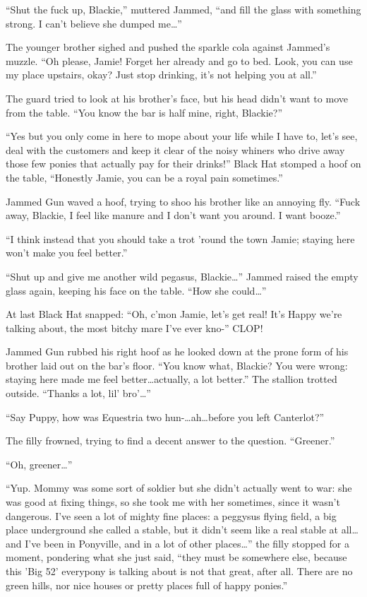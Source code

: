 ``Shut the fuck up, Blackie,'' muttered Jammed, ``and fill the glass with something strong. I can't believe she dumped me\dots''

The younger brother sighed and pushed the sparkle cola against Jammed's muzzle. ``Oh please, Jamie! Forget her already and go to bed. Look, you can use my place upstairs, okay? Just stop drinking, it's not helping you at all.''

The guard tried to look at his brother's face, but his head didn't want to move from the table. ``You know the bar is half mine, right, Blackie?''

``Yes but you only come in here to mope about your life while I have to, let's see, deal with the customers and keep it clear of the noisy whiners who drive away those few ponies that actually pay for their drinks!'' Black Hat stomped a hoof on the table, ``Honestly Jamie, you can be a royal pain sometimes.''

Jammed Gun waved a hoof, trying to shoo his brother like an annoying fly. ``Fuck away, Blackie, I feel like manure and I don't want you around. I want booze.''

``I think instead that you should take a trot 'round the town Jamie; staying here won't make you feel better.''

``Shut up and give me another wild pegasus, Blackie\dots'' Jammed raised the empty glass again, keeping his face on the table. ``How she could\dots''

At last Black Hat snapped: ``Oh, c'mon Jamie, let's get real! It's Happy we're talking about, the most bitchy mare I've ever kno-'' CLOP!

Jammed Gun rubbed his right hoof as he looked down at the prone form of his brother laid out on the bar's floor. ``You know what, Blackie? You were wrong: staying here made me feel better\dots actually, a lot better.'' The stallion trotted outside. ``Thanks a lot, lil' bro'\dots''

\horizonline


``Say Puppy, how was Equestria two hun-\dots ah\dots before you left Canterlot?''

The filly frowned, trying to find a decent answer to the question. ``Greener.''

``Oh, greener\dots''

``Yup. Mommy was some sort of soldier but she didn't actually went to war: she was good at fixing things, so she took me with her sometimes, since it wasn't dangerous. I've seen a lot of mighty fine places: a peggysus flying field, a big place underground she called a stable, but it didn't seem like a real stable at all\dots and I've been in Ponyville, and in a lot of other places\dots'' the filly stopped for a moment, pondering what she just said, ``they must be somewhere else, because this 'Big 52' everypony is talking about is not that great, after all. There are no green hills, nor nice houses or pretty places full of happy ponies.''

